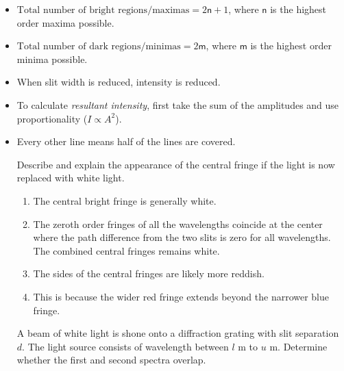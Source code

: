 \documentclass[oneside]{book}
\begin{document}
\begin{itemize}
    \item \(\text{Total number of bright regions/maximas}=2\mathsf{n}+1\), where \(\mathsf{n}\) is the highest order maxima possible.
    \item \(\text{Total number of dark regions/minimas}=2\mathsf{m}\), where \(\mathsf{m}\) is the highest order minima possible.
    \item When slit width is reduced, intensity is reduced.
    \item To calculate \emph{resultant intensity}, first take the sum of the amplitudes and use proportionality (\(I \propto A^2\)).  
    \item Every other line means half of the lines are covered.
    \begin{example}{}{}
        Describe and explain the appearance of the central fringe if the light is now replaced with white light.
    \begin{enumerate}
        \item The central bright fringe is generally white.
        \item The zeroth order fringes of all the wavelengths coincide at the center where the path difference from the two slits is zero for all wavelengths. The combined central fringes remains white.
        \item The sides of the central fringes are likely more reddish.
        \item  This is because the wider red fringe extends beyond the narrower blue fringe.
    \end{enumerate}
    \end{example}
    \begin{example}{}{}
        A beam of white light is shone onto a diffraction grating with slit separation \(d\). The light source consists of wavelength between \(l\) m to \(u\) m. Determine whether the first and second spectra overlap.


\end{example}
\end{itemize}
\end{document}

